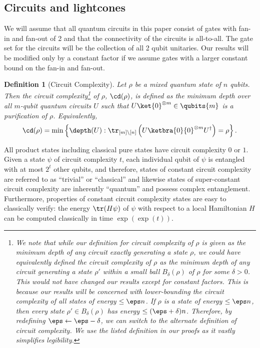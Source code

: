 \documentclass[11pt]{article}
\newtheorem{definition}[theorem]{Definition}
\begin{document}
\subsection{Circuits and lightcones}

We will assume that all quantum circuits in this %
paper  %
consist of gates with fan-in and fan-out of 2 and that the connectivity of the circuits is all-to-all. The gate set for the circuits will be the collection of all 2 qubit unitaries. Our results will be modified only by a constant factor if we assume gates with a larger constant bound on the fan-in and fan-out.

\begin{definition}[Circuit Complexity]
\label{def:cc}
Let $\rho$ be a mixed quantum state of $n$ qubits. Then the circuit complexity\footnote{We note that while our definition for circuit complexity of $\rho$ is given as the minimum depth of any circuit exactly generating a state $\rho$, we could have equivalently defined the circuit complexity of $\rho$ as the minimum depth of any circuit generating a state $\rho'$ within a small ball $B_\delta(\rho)$ of $\rho$ for some $\delta > 0$. This would not have changed our results except for constant factors. This is because our results will be concerned with lower-bounding the circuit complexity of all states of energy $\leq \eps n$. If $\rho$ is a state of energy $\leq \eps n$, then every state $\rho' \in B_\delta(\rho)$ has energy $\leq (\eps + \delta) n$. Therefore, by redefining $\eps \leftarrow \eps - \delta$, we can switch to the alternate definition of circuit complexity. We use the listed definition in our proofs as it vastly simplifies legibility.} of $\rho$, $\cd(\rho)$, is defined as the minimum depth over all $m$-qubit quantum circuits $U$ such that $U \ket{0}^{\otimes m} \in \qubits{m}$ is a purification of $\rho$. Equivalently,
\begin{align}
\cd(\rho) = \min \left\{ \depth(U) : \tr_{[m] \setminus [n]}\left(U \ketbra{0}{0}^{\otimes m} U^\dagger \right) = \rho \right\}.
\end{align}
\end{definition}

%

All product states including classical pure states have circuit complexity $0$ or $1$.
Given a state $\psi$ of circuit complexity $t$, each individual qubit of $\psi$ is entangled with at most $2^t$ other qubits, and therefore, states of constant circuit complexity are referred to as ``trivial'' or ``classical'' and likewise states of super-constant circuit complexity are inherently ``quantum'' and possess complex entanglement. Furthermore, properties of constant circuit complexity states are easy to classically verify: the energy $\tr(H \psi)$ of $\psi$ with respect to a local Hamiltonian $H$ can be computed classically in time $\exp(\exp(t))$. 
\end{document}
